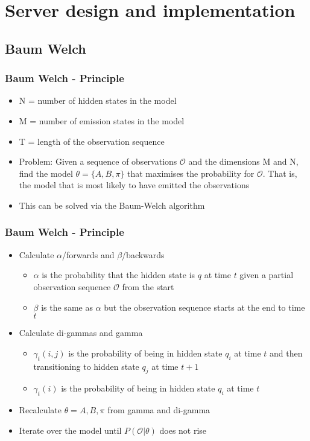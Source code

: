 \section{Server design and implementation}
\subsection{Baum Welch}
\begin{frame}
	\frametitle{Baum Welch - Principle}
	\begin{itemize}
		\item N = number of hidden states in the model
		\item M = number of emission states in the model
		\item T = length of the observation sequence
		\item Problem: Given a sequence of observations $\mathcal{O}$ and the dimensions M and N, find the model $\theta = \{A, B, \pi\}$ that maximises the probability for $\mathcal{O}$. That is, the model that is most likely to have emitted the observations
		\item This can be solved via the Baum-Welch algorithm
	\end{itemize}
\end{frame}

\begin{frame}
	\frametitle{Baum Welch - Principle}
	\begin{itemize}
		\item Calculate $\alpha$/forwards and $\beta$/backwards
		\begin{itemize}
			\item $\alpha$ is the probability that the hidden state is $q$ at time $t$ given a partial observation sequence $\mathcal{O}$ from the start
			\item $\beta$ is the same as $\alpha$ but the observation sequence starts at the end to time $t$
		\end{itemize}
		\item Calculate di-gammas and gamma
		\begin{itemize}
			\item $\gamma_t(i,j)$ is the probability of being in hidden state $q_i$ at time $t$ and then transitioning to hidden state $q_j$ at time $t+1$
			\item $\gamma_t(i)$ is the probability of being in hidden state $q_i$ at time $t$
		\end{itemize}
		\item Recalculate $\theta = {A,B,\pi}$ from gamma and di-gamma
        \item Iterate over the model until $P(\mathcal{O}|\theta)$ does not rise
	\end{itemize}
\end{frame}

